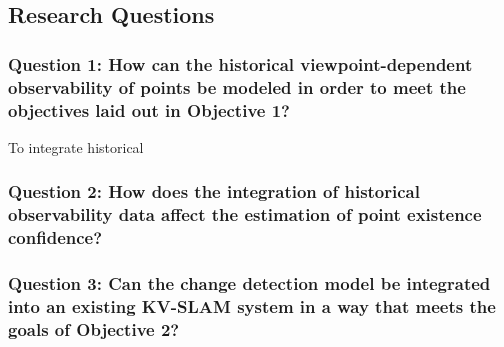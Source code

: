 \subsection{Research Questions}

\subsubsection*{Question 1: How can the historical viewpoint-dependent observability of points be modeled in order to meet the objectives laid out in Objective 1?}

To integrate historical 

\subsubsection*{Question 2: How does the integration of historical observability data affect the estimation of point existence confidence?}



\subsubsection*{Question 3: Can the change detection model be integrated into an existing KV-SLAM system in a way that meets the goals of Objective 2?}